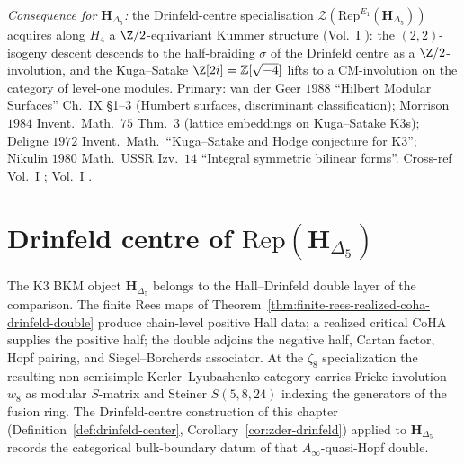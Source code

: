 \begin{remark}
\emph{Consequence for $\mathbf H_{\Delta_5}$:} the Drinfeld-centre
specialisation $\mathcal Z(\mathrm{Rep}^{E_1}(\mathbf H_{\Delta_5}))$
acquires along $H_4$ a $\Z/2$-equivariant Kummer structure
(Vol.~I \cite{VolI}): the
$(2,2)$-isogeny descent descends to the half-braiding $\sigma$ of the
Drinfeld centre as a $\Z/2$-involution, and the Kuga--Satake
$\Z[2i] = \mathbb Z[\sqrt{-4}]$ lifts to a CM-involution on the
category of level-one modules. Primary:
van der Geer $1988$ ``Hilbert Modular Surfaces'' Ch.\ IX
\S 1--3 (Humbert surfaces, discriminant classification);
Morrison $1984$ Invent.\ Math.\ $75$ Thm.\ 3 (lattice embeddings on
Kuga--Satake K3s); Deligne $1972$ Invent.\ Math.\ ``Kuga--Satake and
Hodge conjecture for K3''; Nikulin $1980$ Math.\ USSR Izv.\ $14$
``Integral symmetric bilinear forms''. Cross-ref
Vol.~I \cite{VolI};
Vol.~I \cite{VolI}.
\end{remark}

\section{Drinfeld centre of \texorpdfstring{$\mathrm{Rep}(\mathbf{H}_{\Delta_5})$}{Rep(H-Delta-5)}}
\label{sec:dc-h-delta5-center-section}

The K3 BKM object $\mathbf{H}_{\Delta_5}$ belongs to the
Hall--Drinfeld double layer of the comparison. The finite Rees maps of
Theorem~\ref{thm:finite-rees-realized-coha-drinfeld-double} produce
chain-level positive Hall data; a realized critical CoHA supplies the
positive half; the double adjoins the negative half, Cartan factor,
Hopf pairing, and Siegel--Borcherds associator. At the
$\zeta_8$ specialization the resulting non-semisimple
Kerler--Lyubashenko category carries Fricke involution $w_8$ as modular
$S$-matrix and Steiner $S(5,8,24)$ indexing the generators of the
fusion ring. The Drinfeld-centre construction of this chapter
(Definition~\ref{def:drinfeld-center},
Corollary~\ref{cor:zder-drinfeld}) applied to
$\mathbf{H}_{\Delta_5}$ records the categorical bulk-boundary datum of
that $A_\infty$-quasi-Hopf double.

